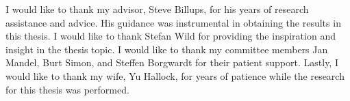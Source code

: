 I would like to thank my advisor, Steve Billups, for his years of research assistance and advice. 
His guidance was instrumental in obtaining the results in this thesis. 
I would like to thank Stefan Wild for providing the inspiration and insight in the thesis topic.
I would like to thank my committee members Jan Mandel, Burt Simon, and Steffen Borgwardt for their
patient support.
Lastly, I would like to thank my wife, Yu Hallock, for years of patience while the research for this thesis was performed.
